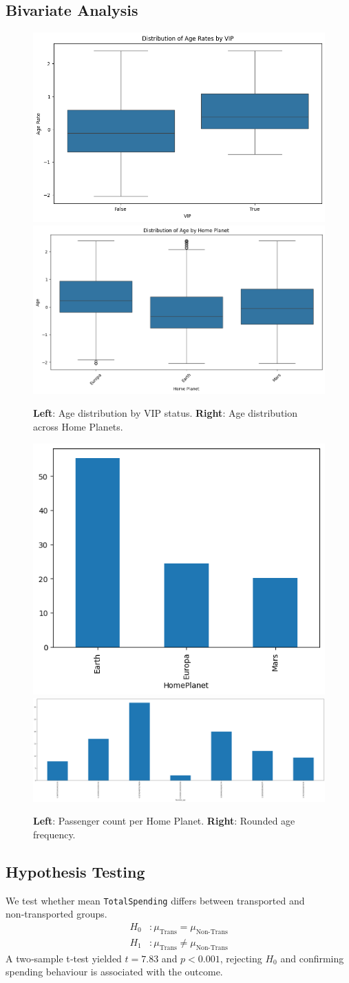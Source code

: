 \documentclass[12pt]{article}
\begin{document}
\subsection{Bivariate Analysis}
\begin{figure}[H]
  \centering
  \includegraphics[width=0.48\linewidth]{output3.png}
  \hfill
  \includegraphics[width=0.48\linewidth]{output4.png}
  \caption{\textbf{Left}: Age distribution by VIP status.  \textbf{Right}: Age distribution across Home Planets.}
\end{figure}
\begin{figure}[H]
  \centering
  \includegraphics[width=0.48\linewidth]{output5.png}
  \hfill
  \includegraphics[width=0.48\linewidth]{output6.png}
  \caption{\textbf{Left}: Passenger count per Home Planet.  \textbf{Right}: Rounded age frequency.}
\end{figure}
\subsection{Hypothesis Testing}
We test whether mean \texttt{TotalSpending} differs between transported and non‑transported groups.
\begin{align*}
  H_0 &: \mu_{\text{Trans}} = \mu_{\text{Non‑Trans}} \\
  H_1 &: \mu_{\text{Trans}} \neq \mu_{\text{Non‑Trans}}
\end{align*}
A two‑sample t‑test yielded $t=7.83$ and $p<0.001$, rejecting $H_0$ and confirming spending behaviour is associated with the outcome.
\end{document}
